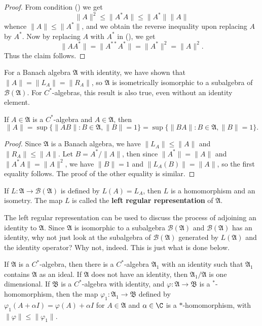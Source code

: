 \begin{proof}
From condition () we get
\[\|A\|^2\leq\|A^*A\|\leq\|A^*\|\|A\|\]
whence $\|A\|\leq\|A^*\|$, and we obtain the reverse inequality upon replacing $A$ by $A^*$. Now by replacing $A$ with $A^*$ in (), we get
\[\|AA^*\|=\|A^{**}A^*\|=\|A^*\|^2=\|A\|^2.\]
Thus the claim follows.
\end{proof}
For a Banach algebra $\mathfrak{A}$ with identity, we have shown that $\|A\|=\|L_A\|=\|R_A\|$, so $\mathfrak{A}$ is isometrically isomorphic to a subalgebra of $\mathcal{B}(\mathfrak{A})$. For $C^*$-algebras, this result is also true, even without an identity element.
\begin{proposition}\label{C^* algebra norm is multiplication}
If $A\in\mathfrak{A}$ is a $C^*$-algebra and $A\in\mathfrak{A}$, then
\[\|A\|=\sup\{\|AB\|:B\in\mathfrak{A},\|B\|=1\}=\sup\{\|BA\|:B\in\mathfrak{A},\|B\|=1\}.\]
\end{proposition}
\begin{proof}
Since $\mathfrak{A}$ is a Banach algebra, we have $\|L_A\|\leq\|A\|$ and $\|R_A\|\leq\|A\|$. Let $B=A^*/\|A\|$, then since $\|A^*\|=\|A\|$ and $\|A^*A\|=\|A\|^2$, we have $\|B\|=1$ and $\|L_A(B)\|=\|A\|$, so the first equality follows. The proof of the other equality is similar.
\end{proof}
If $L:\mathfrak{A}\to\mathcal{B}(\mathfrak{A})$ is defined by $L(A)=L_A$, then $L$ is a homomorphism and an isometry. The map $L$ is called the \textbf{left regular representation} of $\mathfrak{A}$.\par
The left regular representation can be used to discuss the process of
adjoining an identity to $\mathfrak{A}$. Since $\mathfrak{A}$ is isomorphic to a subalgebra $\mathcal{B}(\mathfrak{A})$ and $\mathcal{B}(\mathfrak{A})$ has an identity, why not just look at the subalgebra of $\mathcal{B}(\mathfrak{A})$ generated by $L(\mathfrak{A})$ and the identity operator? Why not, indeed. This is just what is done below.
\begin{proposition}\label{C^* algebra adjoining identity}
If $\mathfrak{A}$ is a $C^*$-algebra, then there is a $C^*$-algebra $\mathfrak{A}_1$ with an identity such that $\mathfrak{A}_1$ contains $\mathfrak{A}$ as an ideal. If $\mathfrak{A}$ does not have an identity, then $\mathfrak{A}_1/\mathfrak{A}$ is one dimensional. If $\mathfrak{B}$ is a $C^*$-algebra with identity, and $\varphi:\mathfrak{A}\to\mathfrak{B}$ is a $^*$-homomorphism, then the map $\varphi_1:\mathfrak{A}_1\to\mathfrak{B}$ defined by $\varphi_1(A+\alpha I)=\varphi(A)+\alpha I$ for $A\in\mathfrak{A}$ and $\alpha\in\C$ is a $*$-homomorphism, with $\|\varphi\|\leq\|\varphi_1\|$.
\end{proposition}
